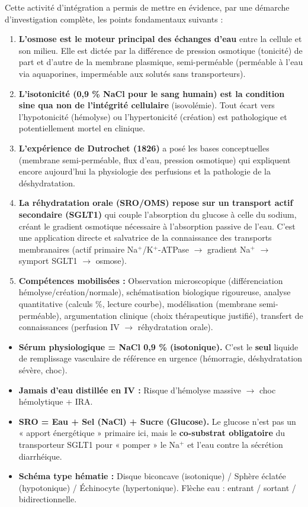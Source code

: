 \documentclass[11pt]{article}
\newcounter{popsec}
\newcounter{popsub}
\newcommand{\courssub}[1]{%
  \stepcounter{popsub}%
  \par\vspace{9pt}\noindent{\popxbold\fontsize{11.5}{13}\selectfont\color{popink}{\color{poporange}\thepopsec.\thepopsub}\hspace{6pt}#1}\par\nopagebreak\vspace{4pt}
}
\begin{document}
\courssub{Bilan de l'activité}
Cette activité d'intégration a permis de mettre en évidence, par une démarche d'investigation complète, les points fondamentaux suivants :
\begin{enumerate}
    \item \textbf{L'osmose est le moteur principal des échanges d'eau} entre la cellule et son milieu. Elle est dictée par la différence de pression osmotique (tonicité) de part et d'autre de la membrane plasmique, semi-perméable (perméable à l'eau via aquaporines, imperméable aux solutés sans transporteurs).
    \item \textbf{L'isotonicité (0,9 \% NaCl pour le sang humain) est la condition sine qua non de l'intégrité cellulaire} (isovolémie). Tout écart vers l'hypotonicité (hémolyse) ou l'hypertonicité (création) est pathologique et potentiellement mortel en clinique.
    \item \textbf{L'expérience de Dutrochet (1826)} a posé les bases conceptuelles (membrane semi-perméable, flux d'eau, pression osmotique) qui expliquent encore aujourd'hui la physiologie des perfusions et la pathologie de la déshydratation.
    \item \textbf{La réhydratation orale (SRO/OMS) repose sur un transport actif secondaire (SGLT1)} qui couple l'absorption du glucose à celle du sodium, créant le gradient osmotique nécessaire à l'absorption passive de l'eau. C'est une application directe et salvatrice de la connaissance des transports membranaires (actif primaire Na$^+$/K$^+$-ATPase $\rightarrow$ gradient Na$^+$ $\rightarrow$ symport SGLT1 $\rightarrow$ osmose).
    \item \textbf{Compétences mobilisées :} Observation microscopique (différenciation hémolyse/création/normale), schématisation biologique rigoureuse, analyse quantitative (calculs \%, lecture courbe), modélisation (membrane semi-perméable), argumentation clinique (choix thérapeutique justifié), transfert de connaissances (perfusion IV $\rightarrow$ réhydratation orale).
\end{enumerate}
\begin{aretenir}
\begin{itemize}
    \item \textbf{Sérum physiologique = NaCl 0,9 \% (isotonique).} C'est le \textbf{seul} liquide de remplissage vasculaire de référence en urgence (hémorragie, déshydratation sévère, choc).
    \item \textbf{Jamais d'eau distillée en IV :} Risque d'hémolyse massive $\rightarrow$ choc hémolytique + IRA.
    \item \textbf{SRO = Eau + Sel (NaCl) + Sucre (Glucose).} Le glucose n'est pas un « apport énergétique » primaire ici, mais le \textbf{co-substrat obligatoire} du transporteur SGLT1 pour « pomper » le Na$^+$ et l'eau contre la sécrétion diarrhéique.
    \item \textbf{Schéma type hématie :} Disque biconcave (isotonique) / Sphère éclatée (hypotonique) / Échinocyte (hypertonique). Flèche eau : entrant / sortant / bidirectionnelle.
\end{itemize}
\end{aretenir}
\end{document}
